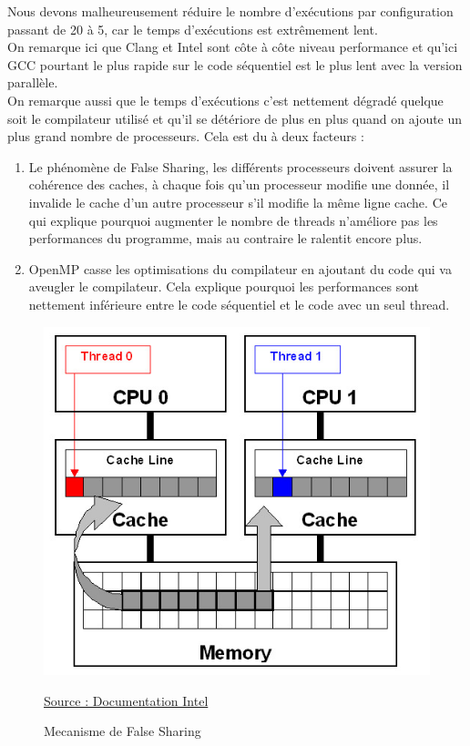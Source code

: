 \documentclass[
 aip,
 jmp,
 amsmath,amssymb,
 reprint
]{revtex4-1}
\begin{document}
Nous devons malheureusement réduire le nombre d'exécutions par configuration passant de 20 à 5, car le temps d'exécutions est extrêmement lent.\\
On remarque ici que Clang et Intel sont côte à côte niveau performance et qu'ici GCC pourtant le plus rapide sur le code séquentiel est le plus lent avec la version parallèle.\\
On remarque aussi que le temps d'exécutions c'est nettement dégradé quelque soit le compilateur utilisé et qu'il se détériore de plus en plus quand on ajoute un plus grand nombre de processeurs. Cela est du à deux facteurs : 
\begin{enumerate}
\item Le phénomène de False Sharing, les différents processeurs doivent assurer la cohérence des caches, à chaque fois qu'un processeur modifie une donnée, il invalide le cache d'un autre processeur s'il modifie la même ligne cache. Ce qui explique pourquoi augmenter le nombre de threads n'améliore pas les performances du programme, mais au contraire le ralentit encore plus.
\item OpenMP casse les optimisations du compilateur en ajoutant du code qui va aveugler le compilateur. Cela explique pourquoi les performances sont nettement inférieure entre le code séquentiel et le code avec un seul thread.
\end{enumerate}

\begin{figure}[H]
  \includegraphics[width=\linewidth, keepaspectratio=true]{false_sharing.jpg}
  \centering
  \caption{Mecanisme de False Sharing\label{Fig:scatter_compact}}{\href{https://software.intel.com/en-us/articles/avoiding-and-identifying-false-sharing-among-threads}{Source : Documentation Intel}
}
\end{figure}
\end{document}
